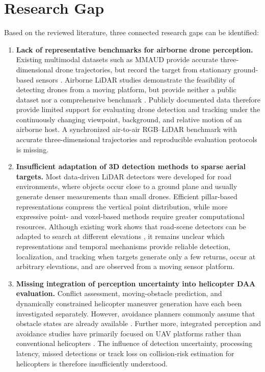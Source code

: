 \section{Research Gap}

Based on the reviewed literature, three connected research gaps can be identified:

\begin{enumerate}
    \item \textbf{Lack of representative benchmarks for airborne drone perception.}  
    Existing multimodal datasets such as MMAUD provide accurate three-dimensional drone trajectories, but record the target from stationary ground-based sensors \cite{yuan2024mmaud}. Airborne LiDAR studies demonstrate the feasibility of detecting drones from a moving platform, but provide neither a public dataset nor a comprehensive benchmark \cite{manduhu2023airborneSenseDetect}. Publicly documented data therefore provide limited support for evaluating drone detection and tracking under the continuously changing viewpoint, background, and relative motion of an airborne host. A synchronized air-to-air RGB--LiDAR benchmark with accurate three-dimensional trajectories and reproducible evaluation protocols is missing.

    \item \textbf{Insufficient adaptation of 3D detection methods to sparse aerial targets.}  
    Most data-driven LiDAR detectors were developed for road environments, where objects occur close to a ground plane and usually generate denser measurements than small drones. Efficient pillar-based representations compress the vertical point distribution, while more expressive point- and voxel-based methods require greater computational resources. Although existing work shows that road-scene detectors can be adapted to search at different elevations \cite{manduhu2023airborneSenseDetect}, it remains unclear which representations and temporal mechanisms provide reliable detection, localization, and tracking when targets generate only a few returns, occur at arbitrary elevations, and are observed from a moving sensor platform.

    \item \textbf{Missing integration of perception uncertainty into helicopter DAA evaluation.}  
    Conflict assessment, moving-obstacle prediction, and dynamically constrained helicopter maneuver generation have each been investigated separately. However, avoidance planners commonly assume that obstacle states are already available \cite{dikarew2024helicopterMPCA}. Further more, integrated perception and avoidance studies have primarily focused on UAV platforms rather than conventional helicopters \cite{crippa2025acasNonCooperative}. The influence of detection uncertainty, processing latency, missed detections or track loss on collision-risk estimation for helicopters is therefore insufficiently understood.
\end{enumerate}
